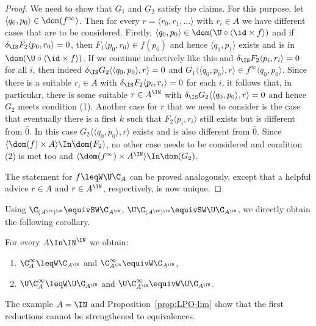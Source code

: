 \begin{proof}
\noindent
We need to show that $G_1$ and $G_2$ satisfy the claims. For this purpose, let $\langle q_0,p_0\rangle\in\dom(f^\infty)$.
Then for every $r=\langle r_0,r_1,...\rangle$ with $r_i\in A$  we have different cases that are to be considered.
Firstly, $\langle q_0,p_0\rangle\in\dom(\U\circ\langle\id\times f\rangle)$ and if $\delta_\IS F_2\langle p_0,r_0\rangle=0$, then $F_1\langle p_0,r_0\rangle\in f(p_0)$ and
hence $\langle q_1,p_1\rangle$ exists and is in $\dom(\U\circ\langle\id\times f\rangle)$. If we continue inductively like this and $\delta_\IS F_2\langle p_i,r_i\rangle=0$
for all $i$, then indeed $\delta_\IS G_2\langle\langle q_0,p_0\rangle,r\rangle=0$ and
$G_1\langle\langle q_0,p_0\rangle,r\rangle\in f^\infty\langle q_0,p_0\rangle$.
Since there is a suitable $r_i\in A$ with $\delta_\IS F_2\langle p_i,r_i\rangle=0$ for each $i$, it follows that,
in particular, there is some suitable $r\in A^\IN$ with $\delta_\IS G_2\langle\langle q_0,p_0\rangle,r\rangle=0$
and hence $G_2$ meets condition (1). Another case for $r$ that we need to consider is the case that
eventually there is a first $k$ such that $F_2\langle p_i,r_i\rangle$ still exists but is different from $\widehat{0}$.
In this case $G_2\langle\langle q_0,p_0\rangle,r\rangle$ exists and is also different from $\widehat{0}$.
Since $\langle \dom(f)\times A\rangle\In\dom(F_2)$, no other case needs to be considered and condition (2)
is met too and $\langle \dom(f^\infty)\times A^\IN\rangle\In\dom(G_2)$.

The statement for $f\leqW\U\C_A$ can be proved analogously, except that a helpful advice 
$r\in A$ and $r\in A^\IN$, respectively, is now unique.
\end{proof}

\noindent
Using $\C_{(A^\IN)^\IN}\equivSW\C_{A^\IN}$, $\U\C_{(A^\IN)^\IN}\equivSW\U\C_{A^\IN}$, 
we directly obtain the following corollary.

\begin{cor}
For every $A\In\IN^\IN$ we obtain:
\begin{enumerate}
\item $\C_A^\infty\leqW\C_{A^\IN}$ and $\C_{A^\IN}^\infty\equivW\C_{A^\IN}$,
\item $\U\C_A^\infty\leqW\U\C_{A^\IN}$ and $\U\C_{A^\IN}^\infty\equivW\U\C_{A^\IN}$.
\end{enumerate}
\end{cor}

\noindent
The example $A=\IN$ and Proposition~\ref{prop:LPO-lim} show that the first reductions cannot be strengthened to equivalences.

